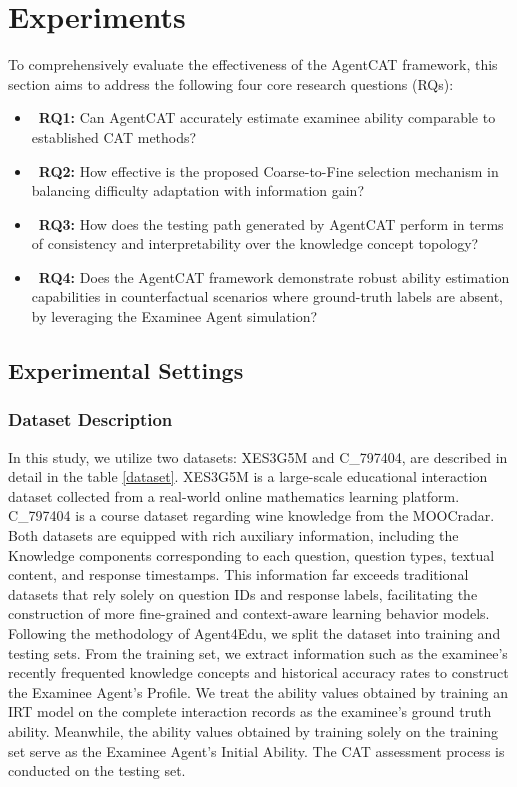 

\section{Experiments}

To comprehensively evaluate the effectiveness of the AgentCAT framework, this section aims to address the following four core research questions (RQs):
\begin{itemize}
    \item ~\textbf{RQ1:} Can AgentCAT accurately estimate examinee ability comparable to established CAT methods?
    \item ~\textbf{RQ2:} How effective is the proposed Coarse-to-Fine selection mechanism in balancing difficulty adaptation with information gain?
    \item ~\textbf{RQ3:} How does the testing path generated by AgentCAT perform in terms of consistency and interpretability over the knowledge concept topology?
    \item ~\textbf{RQ4:} Does the AgentCAT framework demonstrate robust ability estimation capabilities in counterfactual scenarios where ground-truth labels are absent, by leveraging the Examinee Agent simulation?
\end{itemize}


\subsection{Experimental Settings}

\subsubsection{Dataset Description}

In this study, we utilize two datasets: XES3G5M and C\_797404, are described in detail in the table \ref{dataset}. XES3G5M is a large-scale educational interaction dataset collected from a real-world online mathematics learning platform\cite{liu2023xes3g5m}. C\_797404 is a course dataset regarding wine knowledge from the MOOCradar\cite{yu2023moocradar}. Both datasets are equipped with rich auxiliary information, including the Knowledge components  corresponding to each question, question types, textual content,  and response timestamps. This information far exceeds traditional datasets that rely solely on question IDs and response labels, facilitating the construction of more fine-grained and context-aware learning behavior models. Following the methodology of Agent4Edu\cite{gao2025agent4edu}, we split the dataset into training and testing sets. From the training set, we extract information such as the examinee's recently frequented knowledge concepts and historical accuracy rates to construct the Examinee Agent's Profile. We treat the ability values obtained by training an IRT model on the complete interaction records as the examinee's ground truth ability. Meanwhile, the ability values obtained by training solely on the training set serve as the Examinee Agent's Initial Ability. The CAT assessment process is conducted on the testing set.

